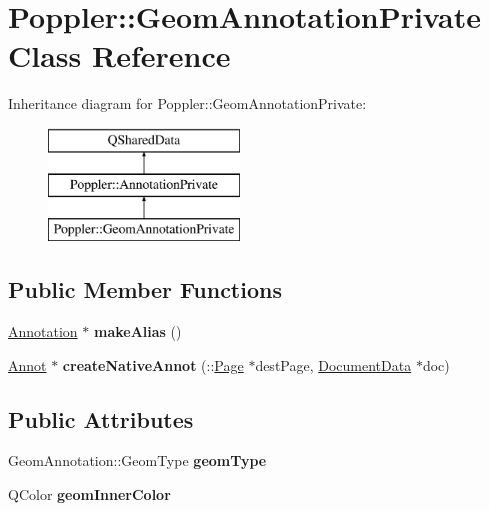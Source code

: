 \hypertarget{class_poppler_1_1_geom_annotation_private}{}\section{Poppler\+:\+:Geom\+Annotation\+Private Class Reference}
\label{class_poppler_1_1_geom_annotation_private}
Inheritance diagram for Poppler\+:\+:Geom\+Annotation\+Private\+:\begin{figure}[H]
\begin{center}
\leavevmode
\includegraphics[height=3.000000cm]{class_poppler_1_1_geom_annotation_private}
\end{center}
\end{figure}
\subsection*{Public Member Functions}
\begin{DoxyCompactItemize}
\item 
\mbox{\label{class_poppler_1_1_geom_annotation_private_a0d99086849ede290444991745bddabd1}} 
\hyperlink{class_poppler_1_1_annotation}{Annotation} $\ast$ {\bfseries make\+Alias} ()
\item 
\mbox{\label{class_poppler_1_1_geom_annotation_private_a4e006cab33e8ad3d52dae2b059a2e319}} 
\hyperlink{class_annot}{Annot} $\ast$ {\bfseries create\+Native\+Annot} (\+::\hyperlink{class_poppler_1_1_page}{Page} $\ast$dest\+Page, \hyperlink{class_poppler_1_1_document_data}{Document\+Data} $\ast$doc)
\end{DoxyCompactItemize}
\subsection*{Public Attributes}
\begin{DoxyCompactItemize}
\item 
\mbox{\label{class_poppler_1_1_geom_annotation_private_a667e2c77554486fa9a290825116d6b6d}} 
Geom\+Annotation\+::\+Geom\+Type {\bfseries geom\+Type}
\item 
\mbox{\label{class_poppler_1_1_geom_annotation_private_a91c391972d8fc1ac6b41979a74087877}} 
Q\+Color {\bfseries geom\+Inner\+Color}
\end{DoxyCompactItemize}
